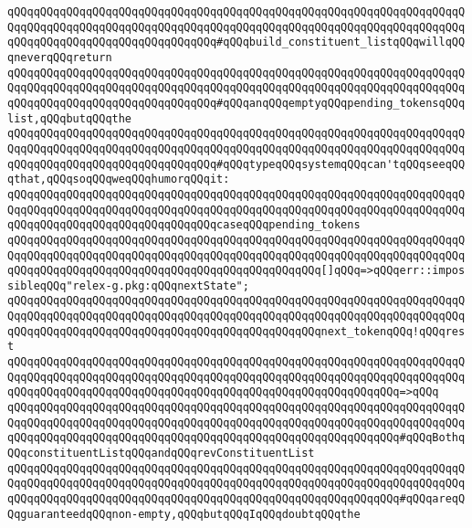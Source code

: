 \newline
\verb|qQQqqQQqqQQqqQQqqQQqqQQqqQQqqQQqqQQqqQQqqQQqqQQqqQQqqQQqqQQqqQQqqQQqqQQqqQQqqQQqqQQqqQQqqQQqqQQqqQQqqQQqqQQqqQQqqQQqqQQqqQQqqQQqqQQqqQQqqQQqqQQqqQQqqQQqqQQqqQQqqQQqqQQqqQQq#qQQqbuild_constituent_listqQQqwillqQQqneverqQQqreturn|\newline
\verb|qQQqqQQqqQQqqQQqqQQqqQQqqQQqqQQqqQQqqQQqqQQqqQQqqQQqqQQqqQQqqQQqqQQqqQQqqQQqqQQqqQQqqQQqqQQqqQQqqQQqqQQqqQQqqQQqqQQqqQQqqQQqqQQqqQQqqQQqqQQqqQQqqQQqqQQqqQQqqQQqqQQqqQQqqQQq#qQQqanqQQqemptyqQQqpending_tokensqQQqlist,qQQqbutqQQqthe|\newline
\verb|qQQqqQQqqQQqqQQqqQQqqQQqqQQqqQQqqQQqqQQqqQQqqQQqqQQqqQQqqQQqqQQqqQQqqQQqqQQqqQQqqQQqqQQqqQQqqQQqqQQqqQQqqQQqqQQqqQQqqQQqqQQqqQQqqQQqqQQqqQQqqQQqqQQqqQQqqQQqqQQqqQQqqQQqqQQq#qQQqtypeqQQqsystemqQQqcan'tqQQqseeqQQqthat,qQQqsoqQQqweqQQqhumorqQQqit:|\newline
\newline
\verb|qQQqqQQqqQQqqQQqqQQqqQQqqQQqqQQqqQQqqQQqqQQqqQQqqQQqqQQqqQQqqQQqqQQqqQQqqQQqqQQqqQQqqQQqqQQqqQQqqQQqqQQqqQQqqQQqqQQqqQQqqQQqqQQqqQQqqQQqqQQqqQQqqQQqqQQqqQQqqQQqqQQqqQQqqQQqcaseqQQqpending_tokens|\newline
\newline
\verb|qQQqqQQqqQQqqQQqqQQqqQQqqQQqqQQqqQQqqQQqqQQqqQQqqQQqqQQqqQQqqQQqqQQqqQQqqQQqqQQqqQQqqQQqqQQqqQQqqQQqqQQqqQQqqQQqqQQqqQQqqQQqqQQqqQQqqQQqqQQqqQQqqQQqqQQqqQQqqQQqqQQqqQQqqQQqqQQqqQQqqQQqqQQq[]qQQq=>qQQqerr::impossibleqQQq"relex-g.pkg:qQQqnextState";|\newline
\newline
\verb|qQQqqQQqqQQqqQQqqQQqqQQqqQQqqQQqqQQqqQQqqQQqqQQqqQQqqQQqqQQqqQQqqQQqqQQqqQQqqQQqqQQqqQQqqQQqqQQqqQQqqQQqqQQqqQQqqQQqqQQqqQQqqQQqqQQqqQQqqQQqqQQqqQQqqQQqqQQqqQQqqQQqqQQqqQQqqQQqqQQqqQQqqQQqnext_tokenqQQq!qQQqrest|\newline
\verb|qQQqqQQqqQQqqQQqqQQqqQQqqQQqqQQqqQQqqQQqqQQqqQQqqQQqqQQqqQQqqQQqqQQqqQQqqQQqqQQqqQQqqQQqqQQqqQQqqQQqqQQqqQQqqQQqqQQqqQQqqQQqqQQqqQQqqQQqqQQqqQQqqQQqqQQqqQQqqQQqqQQqqQQqqQQqqQQqqQQqqQQqqQQqqQQqqQQqqQQq=>qQQq|\newline
\newline
\verb|qQQqqQQqqQQqqQQqqQQqqQQqqQQqqQQqqQQqqQQqqQQqqQQqqQQqqQQqqQQqqQQqqQQqqQQqqQQqqQQqqQQqqQQqqQQqqQQqqQQqqQQqqQQqqQQqqQQqqQQqqQQqqQQqqQQqqQQqqQQqqQQqqQQqqQQqqQQqqQQqqQQqqQQqqQQqqQQqqQQqqQQqqQQqqQQqqQQqqQQq#qQQqBothqQQqconstituentListqQQqandqQQqrevConstituentList|\newline
\verb|qQQqqQQqqQQqqQQqqQQqqQQqqQQqqQQqqQQqqQQqqQQqqQQqqQQqqQQqqQQqqQQqqQQqqQQqqQQqqQQqqQQqqQQqqQQqqQQqqQQqqQQqqQQqqQQqqQQqqQQqqQQqqQQqqQQqqQQqqQQqqQQqqQQqqQQqqQQqqQQqqQQqqQQqqQQqqQQqqQQqqQQqqQQqqQQqqQQqqQQq#qQQqareqQQqguaranteedqQQqnon-empty,qQQqbutqQQqIqQQqdoubtqQQqthe|\newline
